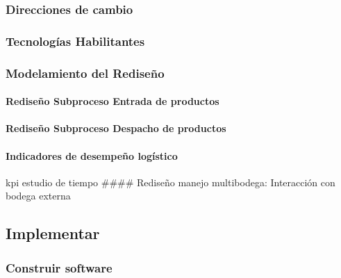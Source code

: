 \documentclass[
]{article}
\begin{document}
\hypertarget{direcciones-de-cambio}{%
\subsubsection{Direcciones de cambio}\label{direcciones-de-cambio}}

\hypertarget{tecnologuxedas-habilitantes}{%
\subsubsection{Tecnologías
Habilitantes}\label{tecnologuxedas-habilitantes}}

\hypertarget{modelamiento-del-rediseuxf1o}{%
\subsubsection{Modelamiento del
Rediseño}\label{modelamiento-del-rediseuxf1o}}

\hypertarget{rediseuxf1o-subproceso-entrada-de-productos}{%
\paragraph{Rediseño Subproceso Entrada de
productos}\label{rediseuxf1o-subproceso-entrada-de-productos}}

\hypertarget{rediseuxf1o-subproceso-despacho-de-productos}{%
\paragraph{Rediseño Subproceso Despacho de
productos}\label{rediseuxf1o-subproceso-despacho-de-productos}}

\hypertarget{indicadores-de-desempeuxf1o-loguxedstico}{%
\paragraph{Indicadores de desempeño
logístico}\label{indicadores-de-desempeuxf1o-loguxedstico}}

kpi estudio de tiempo \#\#\#\# Rediseño manejo multibodega: Interacción
con bodega externa

\hypertarget{implementar-1}{%
\subsection{Implementar}\label{implementar-1}}

\hypertarget{construir-software-1}{%
\subsubsection{Construir software}\label{construir-software-1}}
\end{document}
